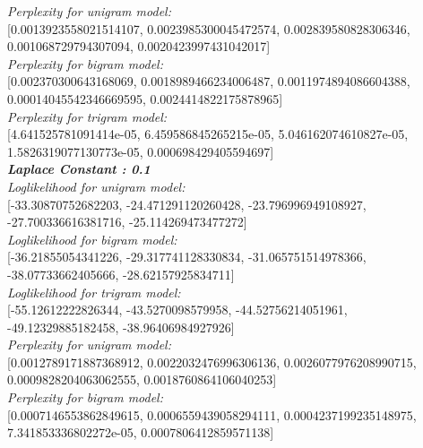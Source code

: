 \documentclass[11ppt]{article}
\begin{document}
\textit{Perplexity for unigram model:} \\ \vspace{1mm}  [0.0013923558021514107, 0.0023985300045472574, 0.002839580828306346, 0.001068729794307094, 0.0020423997431042017]  \\ \vspace{2mm}
\textit{Perplexity for bigram model:} \\ \vspace{1mm}  [0.002370300643168069, 0.0018989466234006487, 0.0011974894086604388, 0.00014045542346669595, 0.0024414822175878965]  \\ \vspace{2mm}
\textit{Perplexity for trigram model:} \\ \vspace{1mm}  [4.641525781091414e-05, 6.459586845265215e-05, 5.046162074610827e-05, 1.5826319077130773e-05, 0.000698429405594697]  \\ \vspace{2mm}
\textit{\textbf{Laplace Constant : 0.1 }}\\ \vspace{2mm}
\textit{Loglikelihood for unigram model:} \\ \vspace{1mm}  [-33.30870752682203, -24.471291120260428, -23.796996949108927, -27.700336616381716, -25.114269473477272]  \\ \vspace{2mm}
\textit{Loglikelihood for bigram model:} \\ \vspace{1mm}  [-36.21855054341226, -29.317741128330834, -31.065751514978366, -38.07733662405666, -28.62157925834711]  \\ \vspace{2mm}
\textit{Loglikelihood for trigram model:} \\ \vspace{1mm}  [-55.12612222826344, -43.5270098579958, -44.52756214051961, -49.12329885182458, -38.96406984927926]  \\ \vspace{2mm}
\textit{Perplexity for unigram model:} \\ \vspace{1mm}  [0.0012789171887368912, 0.0022032476996306136, 0.0026077976208990715, 0.0009828204063062555, 0.0018760864106040253]  \\ \vspace{2mm}
\textit{Perplexity for bigram model:} \\ \vspace{1mm}  [0.0007146553862849615, 0.0006559439058294111, 0.0004237199235148975, 7.341853336802272e-05, 0.0007806412859571138]  \\ \vspace{2mm}
\end{document}
